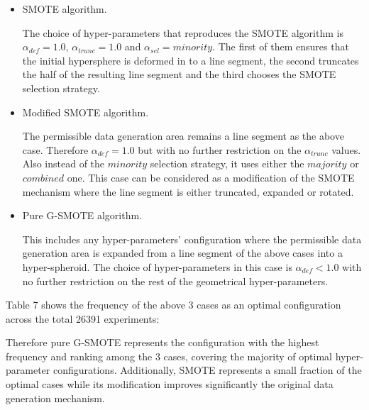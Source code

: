 \documentclass[parskip=full]{scrartcl}
\begin{document}
\begin{itemize}
	
	\renewcommand\labelitemi{--}

	\item SMOTE algorithm.

	The choice of hyper-parameters that reproduces the SMOTE algorithm is
	\(\alpha_{def} = 1.0 \), \( \alpha_{trunc} = 1.0 \) and \( \alpha_{sel} =
	minority \). The first of them ensures that the initial hypersphere is
	deformed in to a line segment, the second truncates the half of the
	resulting line segment and the third chooses the SMOTE selection strategy.

	\item Modified SMOTE algorithm.

	The permissible data generation area remains a line segment as the above
	case. Therefore \( \alpha_{def} = 1.0 \) but with no further restriction on
	the \(\alpha_{trunc} \) values. Also instead of the \( minority \) selection
	strategy, it uses either the \( majority \) or \( combined \) one. This case
	can be considered as a modification of the SMOTE mechanism where the line
	segment is either truncated, expanded or rotated.

	\item Pure G-SMOTE algorithm.

	This includes any hyper-parameters' configuration where the permissible data
	generation area is expanded from a line segment of the above cases into a
	hyper-spheroid. The choice of hyper-parameters in this case is
	\(\alpha_{def} < 1.0 \) with no further restriction on the rest of the
	geometrical hyper-parameters.

\end{itemize}

Table 7 shows the frequency of the above 3 cases as an optimal configuration
across the total 26391 experiments:


Therefore pure G-SMOTE represents the configuration with the highest frequency
and ranking among the 3 cases, covering the majority of optimal hyper-parameter
configurations. Additionally, SMOTE represents a small fraction of the optimal
cases while its modification improves significantly the original data generation
mechanism.
\end{document}
